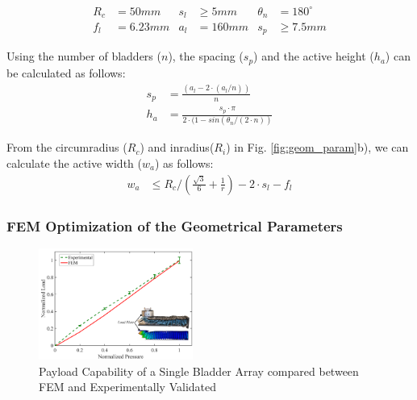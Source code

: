 \documentclass[letterpaper, 10 pt, conference]{ieeeconf}  %
\begin{document}
\begin{align*}
R_c &= 50mm    &  s_l &\geq 5mm      &  \theta_n&=180^\circ\\
f_l&=6.23mm         &  a_l&=160mm   &  s_p&\geq7.5mm
\label{eq:constraints}
\end{align*}

Using the number of bladders ($n$), the spacing ($s_{p}$) and the active height ($h_{a}$) can be calculated as follows:
\begin{align} 
s_p &=  \frac{(a_{l} - 2\cdot(a_l/n))}{n} \\ 
h_a &=  \frac{s_p \cdot \pi}{2\cdot(1-sin(\theta_n/(2\cdot n))}
\label{eq:sp_ha}
\end{align}

From the circumradius ($R_c$) and inradius($R_i$) in Fig. \ref{fig:geom_param}b), we can calculate the active width ($w_a$) as follows:
\begin{align} 
w_a &\leq  R_c/(\frac{\sqrt{3}}{6} + \frac{1}{r}) - 2\cdot s_l -f_l \label{eq:wa_ha}
\end{align}

\subsubsection{FEM Optimization of the Geometrical Parameters}

\begin{figure}[b!]
\centering
\includegraphics[width=0.45\textwidth]{Figures/single_FEM_REAL}
\caption{Payload Capability of a Single Bladder Array compared between FEM and Experimentally Validated}
\label{fig:single_fem_real}
\vspace{-1.5em}
\end{figure}
\end{document}
